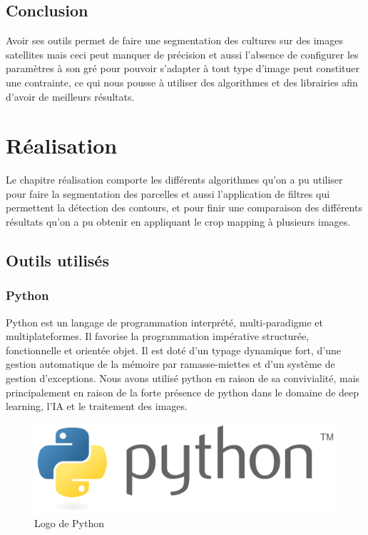 \documentclass[12pt, openany]{report}
\begin{document}
\section*{Conclusion}
Avoir ses outils permet de faire une segmentation des cultures sur des images satellites mais ceci peut manquer de précision et aussi l'absence de configurer les paramètres à son gré pour pouvoir s'adapter à tout type d'image peut constituer une contrainte, ce qui nous pousse à utiliser des algorithmes et des librairies afin d'avoir de meilleurs résultats.


\chapter{Réalisation}

Le chapitre réalisation comporte les différents algorithmes qu'on a pu utiliser pour faire la segmentation des parcelles et aussi l'application de filtres qui permettent la détection des contours, et pour finir une comparaison des différents résultats qu'on a pu obtenir en appliquant le crop mapping à plusieurs images. 



\newpage

\section{Outils utilisés}

\subsection{Python}

Python est un langage de programmation interprété, multi-paradigme et multiplateformes. Il favorise la programmation impérative structurée, fonctionnelle et orientée objet. Il est doté d'un typage dynamique fort, d'une gestion automatique de la mémoire par ramasse-miettes et d'un système de gestion d'exceptions.
Nous avons utilisé python en raison de sa convivialité, mais principalement en raison de la forte présence de python dans le domaine de deep learning, l'IA et le traitement des images.

\begin{figure}[H]
\centering
\includegraphics[scale=0.2]{python.png}
\caption{Logo de Python}
\end{figure}
\end{document}
